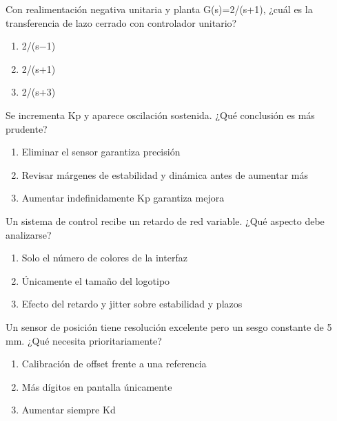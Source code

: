 \noindent\begin{minipage}{\linewidth}\setlength{\parskip}{4pt}\label{q:H-094}
Con realimentación negativa unitaria y planta G(s)=2/(s+1), ¿cuál es la transferencia de lazo cerrado con controlador unitario?
\begin{enumerate}[label=\Alph*),nosep]
\item 2/(s−1)
\item 2/(s+1)
\item 2/(s+3)
\end{enumerate}\end{minipage}\par\medskip

\noindent\begin{minipage}{\linewidth}\setlength{\parskip}{4pt}\label{q:H-095}
Se incrementa Kp y aparece oscilación sostenida. ¿Qué conclusión es más prudente?
\begin{enumerate}[label=\Alph*),nosep]
\item Eliminar el sensor garantiza precisión
\item Revisar márgenes de estabilidad y dinámica antes de aumentar más
\item Aumentar indefinidamente Kp garantiza mejora
\end{enumerate}\end{minipage}\par\medskip

\noindent\begin{minipage}{\linewidth}\setlength{\parskip}{4pt}\label{q:H-096}
Un sistema de control recibe un retardo de red variable. ¿Qué aspecto debe analizarse?
\begin{enumerate}[label=\Alph*),nosep]
\item Solo el número de colores de la interfaz
\item Únicamente el tamaño del logotipo
\item Efecto del retardo y jitter sobre estabilidad y plazos
\end{enumerate}\end{minipage}\par\medskip

\noindent\begin{minipage}{\linewidth}\setlength{\parskip}{4pt}\label{q:H-097}
Un sensor de posición tiene resolución excelente pero un sesgo constante de 5 mm. ¿Qué necesita prioritariamente?
\begin{enumerate}[label=\Alph*),nosep]
\item Calibración de offset frente a una referencia
\item Más dígitos en pantalla únicamente
\item Aumentar siempre Kd
\end{enumerate}\end{minipage}\par\medskip

